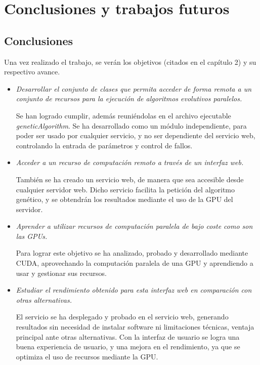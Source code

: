 \chapter{Conclusiones y trabajos futuros}


\bigskip
\section{Conclusiones}
\bigskip

Una vez realizado el trabajo, se verán los objetivos (citados en el capítulo 2) y su respectivo avance.


\begin{itemize}
	
	\item  \textit{Desarrollar el conjunto de clases que permita acceder de forma remota a un conjunto de recursos para la ejecución de algoritmos evolutivos paralelos.}
	
	Se han logrado cumplir, además reuniéndolas en el archivo ejecutable \textit{geneticAlgorithm}. Se ha desarrollado como un módulo independiente, para poder ser usado por cualquier servicio, y no ser dependiente del servicio web, controlando la entrada de parámetros y control de fallos.
	
	\item  \textit{Acceder a un recurso de computación remoto a través de un interfaz web.}
	
	También se ha creado un servicio web, de manera que sea accesible desde cualquier servidor web. Dicho servicio facilita la petición del algoritmo genético, y se obtendrán los resultados mediante el uso de la GPU del servidor.
	
	\item  \textit{Aprender a utilizar recursos de computación paralela de bajo coste como son las GPUs.}
	
	Para lograr este objetivo se ha analizado, probado y desarrollado mediante CUDA, aprovechando la computación paralela de una GPU y aprendiendo a usar y gestionar sus recursos.
	
	\item  \textit{Estudiar el rendimiento obtenido para esta interfaz web en comparación con otras alternativas.}
	
	El servicio se ha desplegado y probado en el servicio web, generando resultados sin necesidad de instalar software ni limitaciones técnicas, ventaja principal ante otras alternativas. Con la interfaz de usuario se logra una buena experiencia de usuario, y una mejora en el rendimiento, ya que se optimiza el uso de recursos mediante la GPU.

	
\end{itemize}	

